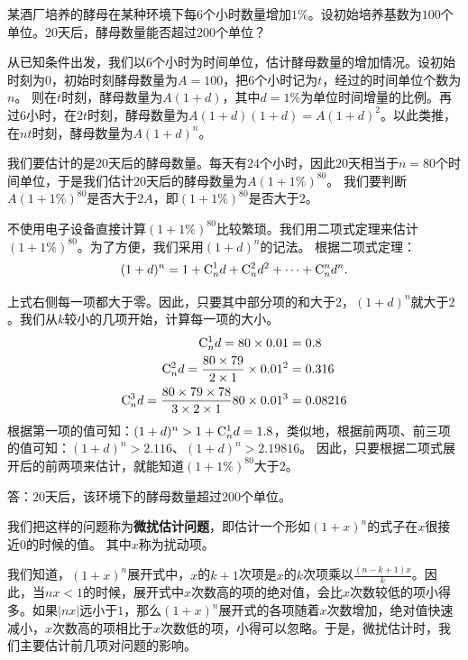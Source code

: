 \documentclass[12pt,UTF8,fontset=none]{ctexbook}
\begin{document}
\begin{et}
某酒厂培养的酵母在某种环境下每$6$个小时数量增加$1\%$。设初始培养基数为$100$个单位。$20$天后，酵母数量能否超过$200$个单位？
\end{et}
\begin{so}  
    从已知条件出发，我们以$6$个小时为时间单位，估计酵母数量的增加情况。设初始时刻为$0$，初始时刻酵母数量为$A = 100$，把$6$个小时记为$t$，经过的时间单位个数为$n$。
    则在$t$时刻，酵母数量为$A(1 + d)$，其中$d=1\%$为单位时间增量的比例。再过$6$小时，在$2t$时刻，酵母数量为$A(1 + d)(1 + d) = A(1 + d)^2$。以此类推，
    在$nt$时刻，酵母数量为$A(1 + d)^n$。

    我们要估计的是$20$天后的酵母数量。每天有$24$个小时，因此$20$天相当于$n=80$个时间单位，于是我们估计$20$天后的酵母数量为$A(1 + 1\%)^{80}$。
    我们要判断$A(1 + 1\%)^{80}$是否大于$2A$，即$(1 + 1\%)^{80}$是否大于$2$。

    不使用电子设备直接计算$(1 + 1\%)^{80}$比较繁琐。我们用二项式定理来估计$(1 + 1\%)^{80}$。为了方便，我们采用$(1 + d)^n$的记法。
    根据二项式定理：
    $$(1 + d)^n = 1 + \mathrm{C}_{n}^{1} d + \mathrm{C}_{n}^{2} d^2 + \cdots + \mathrm{C}_{n}^{n} d^n.$$
    
    上式右侧每一项都大于零。因此，只要其中部分项的和大于$2$，$(1 + d)^n$就大于$2$。我们从$k$较小的几项开始，计算每一项的大小。
    \begin{align*}
        \mathrm{C}_{n}^{1} d = 80 \times 0.01 &= 0.8  \\
        \mathrm{C}_{n}^{2} d = \frac{80 \times 79}{2\times 1} \times 0.01^2 &= 0.316  \\ 
        \mathrm{C}_{n}^{3} d = \frac{80 \times 79\times 78}{3\times 2\times 1}80 \times 0.01^3 &= 0.08216 
    \end{align*}
    根据第一项的值可知：$(1 + d)^n > 1 + \mathrm{C}_{n}^{1} d = 1.8$，类似地，根据前两项、前三项的值可知：$(1 + d)^n > 2.116$、$(1 + d)^n > 2.19816$。
    因此，只要根据二项式展开后的前两项来估计，就能知道$(1 + 1\%)^{80}$大于$2$。
    
    答：$20$天后，该环境下的酵母数量超过$200$个单位。
\end{so}

我们把这样的问题称为\textbf{微扰估计问题}，即估计一个形如$(1+x)^n$的式子在$x$很接近$0$的时候的值。
其中$x$称为扰动项。

我们知道，$(1+x)^n$展开式中，$x$的$k+1$次项是$x$的$k$次项乘以$\frac{(n-k+1)x}{k}$。因此，当$nx<1$的时候，展开式中$x$次数高的项的绝对值，会比$x$次数较低的项小得多。如果$|nx|$远小于$1$，那么$(1+x)^n$展开式的各项随着$x$次数增加，绝对值快速减小，$x$次数高的项相比于$x$次数低的项，小得可以忽略。于是，微扰估计时，我们主要估计前几项对问题的影响。
\end{document}
